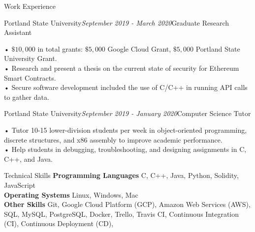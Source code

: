 \documentclass{resume} %
\begin{document}
\clearpage
\newpage
\mbox{}
\clearpage
\newpage


\begin{rSection}{Work Experience}

  \begin{rSubsection}{Portland State University}{{\em{September 2019 - March 2020}}}{Graduate Research Assistant}{}
\item • $\$10,000$ in total grants: $\$5,000$ Google Cloud Grant, $\$5,000$ Portland State University Grant.
  \\• Research and present a thesis on the current state of security for Ethereum Smart Contracts.
  \\• Secure software development included the use of C/C++ in running API calls to gather data.
\end{rSubsection}

  \begin{rSubsection}{Portland State University}{{\em{September 2019 - January 2020}}}{Computer Science Tutor}{}
\item • Tutor 10-15 lower-division students per week in object-oriented programming, discrete structures, and x86 assembly to improve academic performance.
\\• Help students in debugging, troubleshooting, and designing assignments in C, C++, and Java.
\end{rSubsection}

\end{rSection}


\begin{rSection}{Technical Skills}
  {\bf{Programming Languages}} C, C++, Java, Python, Solidity, JavaScript\\
  {\bf{Operating Systems}} Linux, Windows, Mac\\
  {\bf{Other Skills}} Git, Google Cloud Platform (GCP), Amazon Web Services (AWS), SQL, MySQL, PostgreSQL, Docker, Trello, Travis CI, Continuous Integration (CI), Continuous Deployment (CD), 

\end{rSection}
\end{document}
